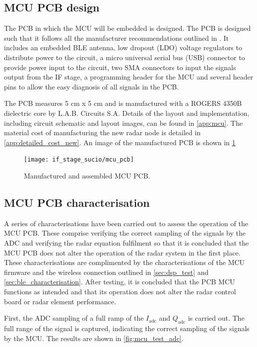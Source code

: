 \subsection{MCU PCB design}\label{sec:mcu-pcb-design}

The PCB in which the MCU will be embedded is designed. The PCB is designed such that it follows all the manufacturer recommendations outlined in \cite{STMicroelectronics2022, STMicroelectronics2022a, STMicroelectronics2022b}. It includes an embedded BLE antenna, low dropout (LDO) voltage regulators to distribute power to the circuit, a micro universal serial bus (USB) connector to provide power input to the circuit, two SMA connectors to input the signals output from the IF stage, a programming header for the MCU and several header pins to allow the easy diagnosis of all signals in the PCB.

The PCB measures 5 cm x 5 cm and is manufactured with a ROGERS 4350B dielectric core by L.A.B. Circuits S.A. Details of the layout and implementation, including circuit schematic and layout images, can be found in \cref{app:mcu}. The material cost of manufacturing the new radar node is detailed in \cref{app:detailed_cost_new}.
An image of the manufactured PCB is shown in \cref{fig:mcu_pcb}

\begin{figure}[h]
	\centering
	\texttt{[image: if\_stage\_sucio/mcu\_pcb]}
	\caption{Manufactured and assembled MCU PCB.}
	\label{fig:mcu_pcb}
\end{figure}

\subsection{MCU PCB characterisation}

A series of characterisations have been carried out to assess the operation of the MCU PCB. These comprise verifying the correct sampling of the signals by the ADC and verifying the radar equation fulfilment so that it is concluded that the MCU PCB does not alter the operation of the radar system in the first place. These characterisations are complimented by the characterisations of the MCU firmware and the wireless connection outlined in \cref{sec:dsp_test} and \cref{sec:ble_characterisation}.
After testing, it is concluded that the PCB MCU functions as intended and that its operation does not alter the radar control board or radar element performance.

First, the ADC sampling of a full ramp of the $I_\mathrm{adc}$ and $Q_\mathrm{adc}$ is carried out. The full range of the signal is captured, indicating the correct sampling of the signals by the MCU. The results are shown in \cref{fig:mcu_test_adc}.

